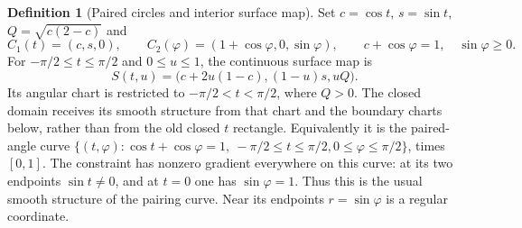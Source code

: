\documentclass[11pt,a4paper]{article}
\theoremstyle{definition}\newtheorem{definition}[theorem]{Definition}
\theoremstyle{remark}\newtheorem{remark}[theorem]{Remark}
\begin{document}
\begin{definition}[Paired circles and interior surface map]\label{def:surface}
Set $c=\cos t$, $s=\sin t$, $Q=\sqrt{c(2-c)}$ and
\[
 C_1(t)=(c,s,0),\qquad C_2(\varphi)=(1+\cos\varphi,0,\sin\varphi),
 \qquad c+\cos\varphi=1,\quad \sin\varphi\geq0.
\]
For $-\pi/2\leq t\leq\pi/2$ and $0\leq u\leq1$, the continuous surface
map is
\begin{equation}\label{eq:surface}
 S(t,u)=\big(c+2u(1-c),(1-u)s,uQ\big).
\end{equation}
Its angular chart is restricted to $-\pi/2<t<\pi/2$, where $Q>0$.
The closed domain receives its smooth structure from that chart and the
boundary charts below, rather than from the old closed $t$ rectangle.
Equivalently it is the paired-angle curve
$\{(t,\varphi):\cos t+\cos\varphi=1,\ -\pi/2\leq t\leq\pi/2,
0\leq\varphi\leq\pi/2\}$, times $[0,1]$.
The constraint has nonzero gradient everywhere on this curve:
at its two endpoints $\sin t\ne0$, and at $t=0$ one has
$\sin\varphi=1$. Thus this is the usual smooth structure of the pairing
curve. Near its endpoints $r=\sin\varphi$ is a regular coordinate.
\end{definition}
\end{document}
